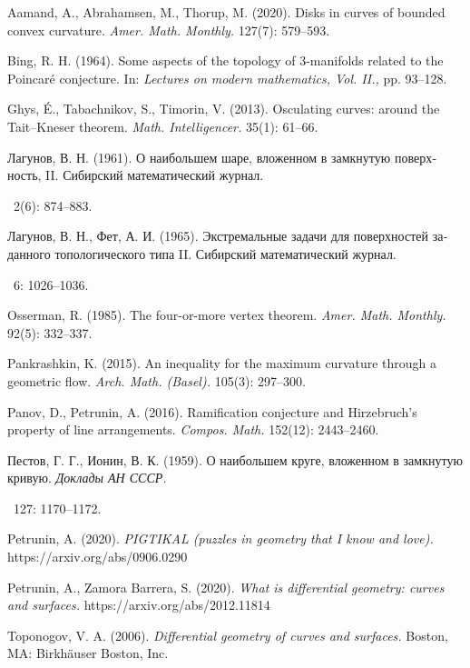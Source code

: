 \documentclass{article}
\theoremstyle{theorem}
\theoremstyle{definition}
\begin{document}
\begin{thebibliography}{1}
Aamand, A.,
Abrahamsen, M.,
Thorup, M.
(2020).
Disks in curves of bounded convex curvature.
\textit{Amer. Math. Monthly.}
127(7): 579--593.

 Bing, R. H.
(1964).
Some aspects of the topology of 3-manifolds related to the Poincaré conjecture. 
In:
\textit{Lectures on modern mathematics, Vol. II.,} 
pp. 93--128.

Ghys, É.,
Tabachnikov, S.,
Timorin, V. 
(2013).
Osculating curves: around the Tait--Kneser theorem.
\textit{Math. Intelligencer.}
35(1): 61--66.


\begin{otherlanguage}{russian}{
Лагунов, В. Н.
(1961).
О наибольшем шаре, вложенном в замкнутую поверхность, II.
Сибирский математический журнал.}\end{otherlanguage}
\ 2(6): 874--883.


\begin{otherlanguage}{russian}{
Лагунов, В. Н., Фет, А. И. 
(1965).
Экстремальные задачи для поверхностей заданного топологического типа II.
Сибирский математический журнал.}\end{otherlanguage}
\ 6: 1026--1036.

Osserman, R. 
(1985).
The four-or-more vertex theorem.
\textit{Amer. Math. Monthly.}
92(5): 332--337.


Pankrashkin, K. 
(2015).
An inequality for the maximum curvature through a geometric flow. 
\textit{Arch. Math. (Basel).} 105(3): 297--300.

Panov, D., Petrunin, A.
(2016).
Ramification conjecture and Hirzebruch’s property of line arrangements.
\textit{Compos. Math.} 152(12): 2443--2460.

\begin{otherlanguage}{russian}{
Пестов, Г. Г., Ионин, В. К.
(1959).
О наибольшем круге, вложенном в замкнутую кривую.
\textit{Доклады АН СССР.}}\end{otherlanguage}\ 
127: 1170--1172.

Petrunin, A.
(2020).
\textit{PIGTIKAL (puzzles in geometry that I know and love).}
https://arxiv.org/abs/0906.0290

Petrunin, A., Zamora Barrera, S.
(2020).
\textit{What is differential geometry: curves and surfaces.}
https://arxiv.org/abs/2012.11814

Toponogov, V. A.
(2006).
\textit{Differential geometry of curves and surfaces.}
Boston, MA: Birkhäuser Boston, Inc.

\end{thebibliography}
\end{document}
